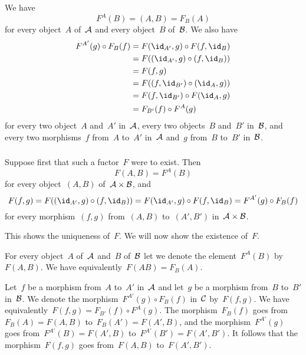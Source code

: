 \subsubsection{}

We have
\[
	F^A(B)
	=
	(A, B)
	=
	F_B(A)
\]
for every object~$A$ of~$\mathcal{A}$ and every object~$B$ of~$\mathcal{B}$.
We also have
\begin{align*}
	F^{A'}(g) \circ F_B(f)
	&=
	F(\id_{A'}, g) \circ F(f, \id_B)
	\\
	&=
	F( (\id_{A'}, g) \circ (f, \id_B) )
	\\
	&=
	F(f, g)
	\\
	&=
	F( (f, \id_{B'}) \circ (\id_A, g) )
	\\
	&=
	F(f, \id_{B'}) \circ F(\id_A, g)
	\\
	&=
	F_{B'}(f) \circ F^A(g)
\end{align*}
for every two object~$A$ and~$A'$ in~$\mathcal{A}$, every two objects~$B$ and~$B'$ in~$\mathcal{B}$, and every two morphisms~$f$ from~$A$ to~$A'$ in~$\mathcal{A}$ and~$g$ from~$B$ to~$B'$ in~$\mathcal{B}$.





\subsubsection{}

Suppose first that such a fuctor~$F$ were to exist.
Then
\[
	F(A, B)
	=
	F^A(B)
\]
for every object~$(A, B)$ of~$\mathcal{A} \times \mathcal{B}$, and
\[
	F(f, g)
	=
	F( (\id_{A'}, g) \circ (f, \id_B) )
	=
	F(\id_{A'}, g) \circ F(f, \id_B)
	=
	F^{A'}(g) \circ F_B(f)
\]
for every morphism~$(f, g)$ from~$(A, B)$ to~$(A', B')$ in~$\mathcal{A} \times \mathcal{B}$.

This shows the uniqueness of~$F$.
We will now show the existence of~$F$.

For every object~$A$ of~$\mathcal{A}$ and~$B$ of~$\mathcal{B}$ let we denote the element~$F^A(B)$ by~$F(A, B)$.
We have equivalently~$F(A B) = F_B(A)$.

Let~$f$ be a morphism from~$A$ to~$A'$ in~$\mathcal{A}$ and let~$g$ be a morphism from~$B$ to~$B'$ in~$\mathcal{B}$.
We denote the morphism~$F^{A'}(g) \circ F_B(f)$ in~$\mathcal{C}$ by~$F(f, g)$.
We have equivalently~$F(f, g) = F_{B'}(f) \circ F^{A}(g)$.
The morphism~$F_B(f)$ goes from~$F_B(A) = F(A, B)$ to~$F_B(A') = F(A', B)$, and the morphism~$F^{A'}(g)$ goes from~$F^{A'}(B) = F(A', B)$ to~$F^{A'}(B') = F(A', B')$.
It follows that the morphism~$F(f, g)$ goes from~$F(A, B)$ to~$F(A', B')$.

